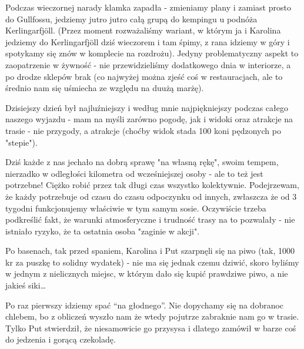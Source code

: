 Podczas wieczornej narady klamka zapadła - zmieniamy plany i zamiast prosto do Gullfossu, jedziemy jutro jutro całą grupą do kempingu u podnóża Kerlingarfjöll. (Przez moment rozważaliśmy wariant, w którym ja i Karolina jedziemy do Kerlingarfjöll dziś wieczorem i tam śpimy, z rana idziemy w góry i spotykamy się znów w komplecie na rozdrożu). Jedyny problematyczny aspekt to zaopatrzenie w żywność - nie przewidzieliśmy dodatkowego dnia w interiorze, a po drodze sklepów brak (co najwyżej można zjeść coś w restauracjach, ale to średnio nam się uśmiecha ze względu na duużą marżę).

Dzisiejszy dzień był najluźniejszy i według mnie najpiękniejszy podczas całego naszego wyjazdu - mam na myśli zarówno pogodę, jak i widoki oraz atrakcje na trasie - nie przygody, a atrakcje (choćby widok stada 100 koni pędzonych po "stepie").

Dziś każde z nas jechało na dobrą sprawę "na własną rękę", swoim tempem, nierzadko w odległości kilometra od wcześniejszej osoby - ale to też jest potrzebne! Ciężko robić przez tak długi czas wszystko kolektywnie. Podejrzewam, że każdy potrzebuje od czasu do czasu odpoczynku od innych, zwłaszcza że od 3 tygodni funkcjonujemy właściwie w tym samym sosie. Oczywiście trzeba podkreślić fakt, że warunki atmosferyczne i trudność trasy na to pozwalały - nie istniało ryzyko, że ta ostatnia osoba "zaginie w akcji".

Po basenach, tak przed spaniem, Karolina i Put szarpnęli się na piwo (tak, 1000 kr za puszkę to solidny wydatek) - nie ma się jednak czemu dziwić, skoro byliśmy w jednym z nielicznych miejsc, w którym dało się kupić prawdziwe piwo, a nie jakieś siki…

Po raz pierwszy idziemy spać “na głodnego”. Nie dopychamy się na dobranoc chlebem, bo z obliczeń wyszło nam że wtedy pojutrze zabraknie nam go w trasie. Tylko Put stwierdził, że niesamowicie go przysysa i dlatego zamówił w barze coś do jedzenia i gorącą czekoladę.
